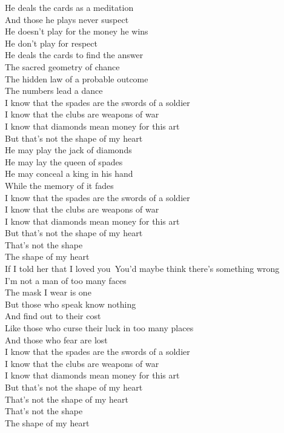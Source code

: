 
He deals the cards as a meditation\\
And those he plays never suspect\\
He doesn't play for the money he wins\\
He don't play for respect\\
He deals the cards to find the answer\\
The sacred geometry of chance\\
The hidden law of a probable outcome\\
The numbers lead a dance\\
\hops
{} I know that the spades are the swords of a soldier\\
 I know that the clubs are weapons of war\\
 I know that diamonds mean money for this art\\
 But that's not the shape of my heart\\
\hops
He may play the jack of diamonds\\
He may lay the queen of spades\\
He may conceal a king in his hand\\
While the memory of it fades\\
\hops
{} I know that the spades are the swords of a soldier\\
 I know that the clubs are weapons of war\\
 I know that diamonds mean money for this art\\
 But that's not the shape of my heart\\
 That's not the shape\\
 The shape of my heart\\
\hops
If I told her that I loved you\
You'd maybe think there's something wrong\\
I'm not a man of too many faces\\
The mask I wear is one\\
But those who speak know nothing\\
And find out to their cost\\
Like those who curse their luck in too many places\\
And those who fear are lost\\
\hops
{} I know that the spades are the swords of a soldier\\
 I know that the clubs are weapons of war\\
 I know that diamonds mean money for this art\\
 But that's not the shape of my heart\\
 That's not the shape of my heart\\
 That's not the shape\\
\refr The shape of my heart